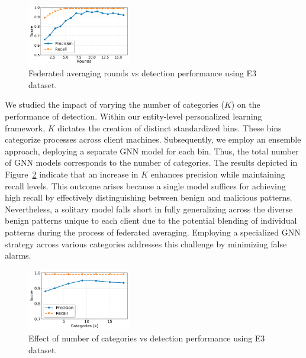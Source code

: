 \begin{figure}[!t]
  \centering
  \includegraphics[width=0.4\textwidth]{fig/roundsvsscore.pdf}
  \caption{Federated averaging rounds vs detection performance using E3 dataset. }
  \label{roundsvsscore}
  \vspace{-2ex}
\end{figure}

 We studied the impact of varying the number of categories ($K$) on the performance of detection. Within our entity-level personalized \gnnshort learning framework, $K$ dictates the creation of distinct standardized bins. These bins categorize processes across client machines. Subsequently, we employ an ensemble approach, deploying a separate GNN model for each bin. Thus, the total number of GNN models corresponds to the number of categories. The results depicted in Figure~\ref{catgvsscore} indicate that an increase in $K$ enhances precision while maintaining recall levels. This outcome arises because a single model suffices for achieving high recall by effectively distinguishing between benign and malicious patterns. Nevertheless, a solitary model falls short in fully generalizing across the diverse benign patterns unique to each client due to the potential blending of individual patterns during the process of federated averaging. Employing a specialized GNN strategy across various categories addresses this challenge by minimizing false alarms.

\begin{figure}[!t]
  \centering
  \includegraphics[width=0.4\textwidth]{fig/kvsscore.pdf}
  \caption{Effect of number of categories vs detection performance using E3 dataset.}
  \label{catgvsscore}
  \vspace{-2ex}
\end{figure}

